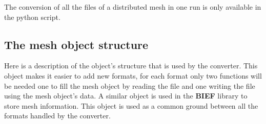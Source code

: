 \documentclass[a4paper,10pt]{article}
\newcommand{\bief}{\textbf{BIEF}\xspace}
\begin{document}
The conversion of all the files of a distributed mesh in one run is only available in the python script.

\subsection{The mesh object structure}

Here is a description of the object's structure that is used by the converter.
This object makes it easier to add new formats, for each format only two functions
will be needed one to fill the mesh object by reading the file and one writing the file using the mesh object's data. 
A similar object is used in the \bief library to store mesh information. 
This object is used as a common ground between all the formats handled by the converter.
\end{document}
